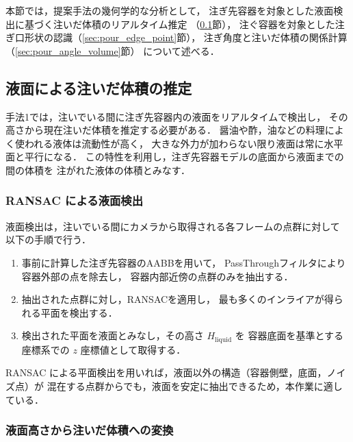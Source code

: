 本節では，提案手法の幾何学的な分析として，
注ぎ先容器を対象とした液面検出に基づく注いだ体積のリアルタイム推定
（\ref{sec:pour_liquid_level}節），
注ぐ容器を対象とした注ぎ口形状の認識（\ref{sec:pour_edge_point}節），
注ぎ角度と注いだ体積の関係計算（\ref{sec:pour_angle_volume}節）
について述べる．

\subsection{液面による注いだ体積の推定}
\label{sec:pour_liquid_level}

手法1では，注いでいる間に注ぎ先容器内の液面をリアルタイムで検出し，
その高さから現在注いだ体積を推定する必要がある．
醤油や酢，油などの料理によく使われる液体は流動性が高く，
大きな外力が加わらない限り液面は常に水平面と平行になる．
この特性を利用し，注ぎ先容器モデルの底面から液面までの間の体積を
注がれた液体の体積とみなす．

\subsubsection{RANSAC による液面検出}

液面検出は，注いでいる間にカメラから取得される各フレームの点群に対して
以下の手順で行う．

\begin{enumerate}
  \item 事前に計算した注ぎ先容器のAABBを用いて，
        PassThroughフィルタにより容器外部の点を除去し，
        容器内部近傍の点群のみを抽出する．
  \item 抽出された点群に対し，RANSACを適用し，
        最も多くのインライアが得られる平面を検出する．
  \item 検出された平面を液面とみなし，その高さ $H_{\mathrm{liquid}}$ を
        容器底面を基準とする座標系での $z$ 座標値として取得する．
\end{enumerate}

RANSAC による平面検出を用いれば，液面以外の構造（容器側壁，底面，ノイズ点）が
混在する点群からでも，液面を安定に抽出できるため，本作業に適している．

\subsubsection{液面高さから注いだ体積への変換}

